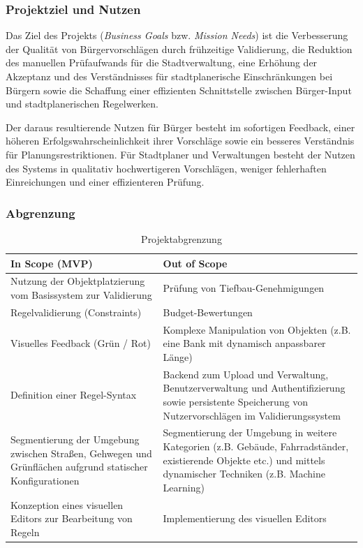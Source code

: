 \subsubsection{Projektziel und Nutzen}

Das Ziel des Projekts (\textit{Business Goals} bzw. \textit{Mission Needs}) ist die Verbesserung der Qualität von Bürgervorschlägen durch frühzeitige Validierung, die Reduktion des manuellen Prüfaufwands für die Stadtverwaltung, eine Erhöhung der Akzeptanz und des Verständnisses für stadtplanerische Einschränkungen bei Bürgern sowie die Schaffung einer effizienten Schnittstelle zwischen Bürger-Input und stadtplanerischen Regelwerken.

Der daraus resultierende Nutzen für Bürger besteht im sofortigen Feedback, einer höheren Erfolgswahrscheinlichkeit ihrer Vorschläge sowie ein besseres Verständnis für Planungsrestriktionen. Für Stadtplaner und Verwaltungen besteht der Nutzen des Systems in qualitativ hochwertigeren Vorschlägen, weniger fehlerhaften Einreichungen und einer effizienteren Prüfung.

\subsubsection{Abgrenzung}

\begin{table}[!h]
\begin{center}
\bgroup
\def\arraystretch{1.5}
    \begin{tabular}{| p{7cm} | p{7cm} |}
    \hline
    In Scope (MVP) & Out of Scope \\
    \hline
    \hline
    
    Nutzung der Objektplatzierung vom Basissystem zur Validierung & Prüfung von Tiefbau-Genehmigungen \\
    \hline
    Regelvalidierung (Constraints) & Budget-Bewertungen \\
    \hline
    Visuelles Feedback (Grün / Rot) & Komplexe Manipulation von Objekten (z.B. eine Bank mit dynamisch anpassbarer Länge) \\
    \hline
    Definition einer Regel-Syntax & Backend zum Upload und Verwaltung, Benutzerverwaltung und Authentifizierung sowie persistente Speicherung von Nutzervorschlägen im Validierungssystem \\
    \hline
    Segmentierung der Umgebung zwischen Straßen, Gehwegen und Grünflächen aufgrund statischer Konfigurationen & Segmentierung der Umgebung in weitere Kategorien (z.B. Gebäude, Fahrradständer, existierende Objekte etc.) und mittels dynamischer Techniken (z.B. Machine Learning) \\
    \hline
    Konzeption eines visuellen Editors zur Bearbeitung von Regeln
     & Implementierung des visuellen Editors \\
     \hline
    
    \end{tabular}
    \egroup
    
\caption{Projektabgrenzung}
\label{tab:Projektabgrenzung}
\end{center}
\end{table}

